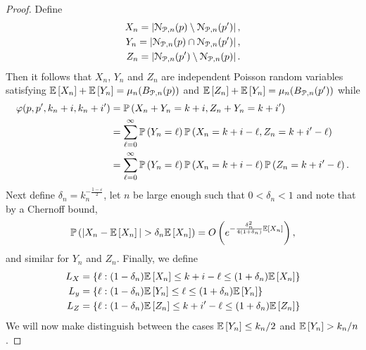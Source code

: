 \begin{appendices}
\begin{proof}
Define
\begin{align*}
	X_n = \left|{\mathcal N}_{{\mathcal P},n}(p) \setminus {\mathcal N}_{{\mathcal P},n}(p^\prime)\right|,\\
	Y_n = \left|{\mathcal N}_{{\mathcal P},n}(p) \cap {\mathcal N}_{{\mathcal P},n}(p^\prime)\right|,\\
	Z_n = \left|{\mathcal N}_{{\mathcal P},n}(p^\prime) \setminus {\mathcal N}_{{\mathcal P},n}(p)\right|.
\end{align*}
Then it follows that $X_n$, $Y_n$ and $Z_n$ are independent Poisson random variables satisfying $\mathbb{E}\left[X_n\right] + \mathbb{E}\left[Y_n\right] = \mu_{n}(B_{{\mathcal P},n}(p))$ and $\mathbb{E}\left[Z_n\right] + \mathbb{E}\left[Y_n\right] = \mu_{n}(B_{{\mathcal P},n}(p^\prime))$ while
\begin{align*}
	\varphi(p,p^\prime,k_n + i,k_n + i^\prime) &= \mathbb{P}\left(X_n + Y_n = k + i, Z_n + Y_n = k + i^\prime\right)\\
	&= \sum_{\ell = 0}^\infty \mathbb{P}\left(Y_n = \ell\right) \mathbb{P}\left(X_n = k + i - \ell, Z_n = k + i^\prime - \ell\right) \\
	&= \sum_{\ell = 0}^\infty \mathbb{P}\left(Y_n = \ell\right) \mathbb{P}\left(X_n = k + i - \ell\right) \mathbb{P}\left(Z_n = k + i^\prime - \ell\right).
\end{align*}
Next define $\delta_n = k_n^{-\frac{1-\varepsilon}{2}}$, let $n$ be large enough such that $0 < \delta_n < 1$ and note that by a Chernoff bound,
\[
	\mathbb{P}\left(|X_n - \mathbb{E}\left[X_n\right]| > \delta_n \mathbb{E}\left[X_n\right]\right) = O\left(e^{-\frac{\delta_n^2}{4(1+\delta_n)} \mathbb{E}\left[X_n\right]}\right),
\]
and similar for $Y_n$ and $Z_n$. Finally, we define
\begin{align*}
	L_X &= \left\{\ell : (1 - \delta_n) \mathbb{E}\left[X_n\right] \le k + i - \ell \le (1+\delta_n)\mathbb{E}\left[X_n\right]\right\} \\
	L_y &= \left\{\ell : (1 - \delta_n) \mathbb{E}\left[Y_n\right] \le \ell \le (1+\delta_n)\mathbb{E}\left[Y_n\right]\right\}\\
	L_Z &= \left\{\ell : (1 - \delta_n) \mathbb{E}\left[Z_n\right] \le k + i^\prime - \ell \le (1+\delta_n)\mathbb{E}\left[Z_n\right]\right\}
\end{align*}
We will now make distinguish between the cases $\mathbb{E}\left[Y_n\right] \le k_n/2$ and $\mathbb{E}\left[Y_n\right] > k_n/n$. 


\end{proof}
\end{appendices}
